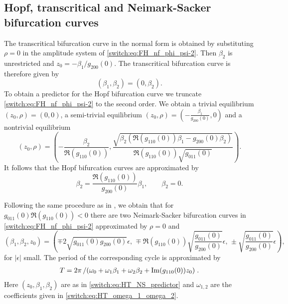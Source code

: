 \begin{subappendices}

\subsection{Hopf, transcritical and Neimark-Sacker bifurcation curves}\label{switch:Sec:HT_NS_predictors}
The transcritical bifurcation curve in the normal form is obtained by substituting $\rho=0$ in the amplitude system of \cref{switch:eq:FH_nf_phi_psi-2}. Then $\beta_{2}$ is unrestricted and  $z_{0}=-\beta_{1}/g_{200}(0)$. The transcritical bifurcation curve is therefore given by
\[
\left(\beta_{1},\beta_{2}\right)=\left(0,\beta_{2}\right).
\]
To obtain a predictor for the Hopf bifurcation curve we truncate \cref{switch:eq:FH_nf_phi_psi-2} to the second order. We obtain a trivial equilibrium $(z_{0},\rho)=(0,0)$, a semi-trivial equilibrium $(z_{0},\rho)=(-\frac{\beta_{1}}{g_{200}(0)},0)$ and a nontrivial equilibrium
\[
(z_{0},\rho)=\left(-\frac{\beta_{2}}{\Re\left(g_{110}(0)\right)},\dfrac{\sqrt{\beta_{2}\left(\Re\left(g_{110}(0)\right)\beta_{1}-g_{200}(0)\beta_{2}\right)}}{\Re\left(g_{110}(0)\right)\sqrt{g_{011}(0)}}\right).
\]
It follows that the Hopf bifurcation curves are approximated by
\[
\beta_{2}=\dfrac{\Re\left(g_{110}(0)\right)}{g_{200}(0)}\beta_{1}, \qquad \beta_{2}=0.
\]

Following the same procedure as in \cite{Kuznetsov2008}, we obtain that for
$g_{011}(0)\Re(g_{110}(0))<0$ there are two Neimark-Sacker bifurcation curves in
\cref{switch:eq:FH_nf_phi_psi-2} approximated by $\rho=0$ and
%
\begin{equation}
\label{switch:eq:HT_NS_predictor}
(\beta_1,\beta_2,z_0)  =\left(\mp 2\sqrt{g_{011}(0)g_{200}(0)}\epsilon,\,
\mp\Re\left(g_{110}(0)\right)\sqrt{\frac{g_{011}(0)}{g_{200}(0)}}\epsilon,\,
\pm\sqrt{\frac{g_{011}(0)}{g_{200}(0)}}\epsilon \right),
\end{equation}
for $|\epsilon|$ small. The period of the corresponding cycle is approximated by
%
\begin{align*}
T = 2\pi \left/\left(\omega_{0}+\omega_{1}\beta_{1}+\omega_{2}\beta_{2}+\Im(g_{110}(0))z_{0}\right)\right. .
\end{align*}
%
Here $(z_{0},\beta_{1},\beta_{2})$ are as in \cref{switch:eq:HT_NS_predictor} and
$\omega_{1,2}$ are the coefficients given in \cref{switch:eq:HT_omega_1_omega_2}.


\end{subappendices}
